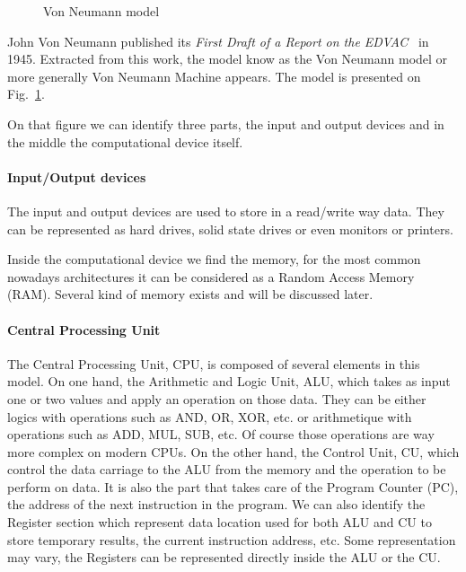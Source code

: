 \begin{figure}
\centering 
{}
\caption{Von Neumann model}
\label{fig:1_HPC:von_neumann_model}
\end{figure}

John Von Neumann published its \textit{First Draft of a Report on the EDVAC}~\cite{von1993first} in 1945. 
Extracted from this work, the model know as the Von Neumann model or more generally Von Neumann Machine appears. 
The model is presented on Fig.~\ref{fig:1_HPC:von_neumann_model}.

On that figure we can identify three parts, the input and output devices and in the middle the computational device itself. 
\paragraph{Input/Output devices}
The input and output devices are used to store in a read/write way data. 
They can be represented as hard drives, solid state drives or even monitors or printers. 

Inside the computational device we find the memory, for the most common nowadays architectures it can be considered as a Random Access Memory (RAM). 
Several kind of memory exists and will be discussed later. 
\paragraph{Central Processing Unit}
The Central Processing Unit, CPU, is composed of several elements in this model. 
On one hand, the Arithmetic and Logic Unit, ALU, which takes as input one or two values and apply an operation on those data. 
They can be either logics with operations such as AND, OR, XOR, etc. or arithmetique with operations such as ADD, MUL, SUB, etc. 
Of course those operations are way more complex on modern CPUs. 
On the other hand, the Control Unit, CU, which control the data carriage to the ALU from the memory and the operation to be perform on data.
It is also the part that takes care of the Program Counter (PC), the address of the next instruction in the program. 
We can also identify the Register section which represent data location used for both ALU and CU to store temporary results, the current instruction address, etc. 
Some representation may vary, the Registers can be represented directly inside the ALU or the CU. 
